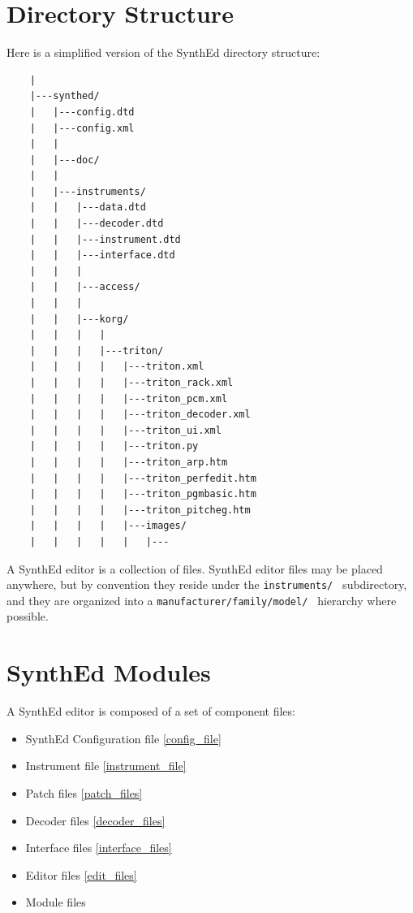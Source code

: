\documentclass[a4paper,twoside,12pt]{article}
\newcommand{\code}[1]{\color{red}\texttt{#1}\color{black}}
\begin{document}
\section{Directory Structure}
Here is a simplified version of the SynthEd directory structure:
\begin{verbatim}
    |
    |---synthed/
    |   |---config.dtd
    |   |---config.xml
    |   |
    |   |---doc/
    |   |
    |   |---instruments/
    |   |   |---data.dtd
    |   |   |---decoder.dtd
    |   |   |---instrument.dtd
    |   |   |---interface.dtd
    |   |   |
    |   |   |---access/
    |   |   |
    |   |   |---korg/
    |   |   |   |
    |   |   |   |---triton/
    |   |   |   |   |---triton.xml
    |   |   |   |   |---triton_rack.xml
    |   |   |   |   |---triton_pcm.xml
    |   |   |   |   |---triton_decoder.xml
    |   |   |   |   |---triton_ui.xml
    |   |   |   |   |---triton.py
    |   |   |   |   |---triton_arp.htm
    |   |   |   |   |---triton_perfedit.htm
    |   |   |   |   |---triton_pgmbasic.htm
    |   |   |   |   |---triton_pitcheg.htm
    |   |   |   |   |---images/
    |   |   |   |   |   |---
\end{verbatim}
A SynthEd editor is a collection of files. SynthEd editor files
may be placed anywhere, but by convention they reside under the
\code{instruments/ } subdirectory, and they are organized into a
\code{manufacturer/family/model/ } hierarchy where possible.

\section{SynthEd Modules}
A SynthEd editor is composed of a set of component files:
\begin{itemize}
\item SynthEd Configuration file \ref{config_file}

\item Instrument file \ref{instrument_file}

\item Patch files \ref{patch_files}

\item Decoder files \ref{decoder_files}

\item Interface files \ref{interface_files}

\item Editor files \ref{edit_files}

\item Module files
\end{itemize}
\end{document}
